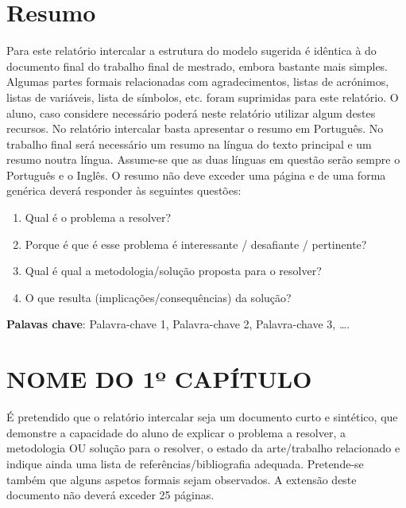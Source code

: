 \documentclass[a4paper,twoside,11pt]{report}
\makeatletter
\def\cleardoublepage{\clearpage\if@twoside \ifodd\c@page\else
    \hbox{}
    \vspace*{\fill}
    \vspace{\fill}
    \thispagestyle{empty}
    \newpage
    \if@twocolumn\hbox{}\newpage\fi\fi\fi}
\makeatother
\begin{document}
\chapter*{Resumo}
Para este relatório intercalar a estrutura do modelo sugerida é idêntica à do documento final do trabalho final de mestrado, embora bastante mais simples. Algumas partes formais relacionadas com agradecimentos, listas de acrónimos, listas de variáveis, lista de símbolos, etc. foram suprimidas para este relatório. O aluno, caso considere necessário poderá neste relatório utilizar algum destes recursos.
No relatório intercalar basta apresentar o resumo em Português. No trabalho final será necessário um resumo na língua do texto principal e um resumo noutra língua. Assume-se que as duas línguas em questão serão sempre o Português e o Inglês.
O resumo não deve exceder uma página e de uma forma genérica deverá responder às seguintes questões:
\begin{enumerate}
    \item Qual é o problema a resolver?
\item	Porque é que é esse problema é interessante / desafiante / pertinente?
\item	Qual é qual a metodologia/solução proposta para o resolver?
\item	O que resulta (implicações/consequências) da solução?
\end{enumerate}

\vspace{1cm}
\noindent \textbf{Palavas chave}: Palavra-chave 1, Palavra-chave 2, Palavra-chave 3, ….


\clearpage

\doublespacing
\tableofcontents
\clearpage
\listoffigures
\clearpage
\listoftables
\clearpage


\onehalfspacing



\chapter{NOME DO 1º CAPÍTULO}
É pretendido que o relatório intercalar seja um documento curto e sintético, que demonstre a capacidade do aluno de explicar o problema a resolver, a metodologia OU solução para o resolver, o estado da arte/trabalho relacionado e indique ainda uma lista de referências/bibliografia adequada. Pretende-se também que alguns aspetos formais sejam observados. 
A extensão deste documento não deverá exceder 25 páginas.
\end{document}
